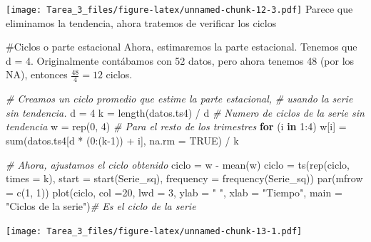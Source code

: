 \documentclass[
]{article}
\newenvironment{Shaded}{\begin{snugshade}}{\end{snugshade}}
\newcommand{\AttributeTok}[1]{\textcolor[rgb]{0.77,0.63,0.00}{#1}}
\newcommand{\CommentTok}[1]{\textcolor[rgb]{0.56,0.35,0.01}{\textit{#1}}}
\newcommand{\ConstantTok}[1]{\textcolor[rgb]{0.00,0.00,0.00}{#1}}
\newcommand{\ControlFlowTok}[1]{\textcolor[rgb]{0.13,0.29,0.53}{\textbf{#1}}}
\newcommand{\DecValTok}[1]{\textcolor[rgb]{0.00,0.00,0.81}{#1}}
\newcommand{\FunctionTok}[1]{\textcolor[rgb]{0.00,0.00,0.00}{#1}}
\newcommand{\NormalTok}[1]{#1}
\newcommand{\OtherTok}[1]{\textcolor[rgb]{0.56,0.35,0.01}{#1}}
\newcommand{\SpecialCharTok}[1]{\textcolor[rgb]{0.00,0.00,0.00}{#1}}
\newcommand{\StringTok}[1]{\textcolor[rgb]{0.31,0.60,0.02}{#1}}
\begin{document}
\texttt{[image: Tarea\_3\_files/figure-latex/unnamed-chunk-12-3.pdf]}
Parece que eliminamos la tendencia, ahora tratemos de verificar los
ciclos

\#Ciclos o parte estacional Ahora, estimaremos la parte estacional.
Tenemos que d = 4. Originalmente contábamos con 52 datos, pero ahora
tenemos 48 (por los NA), entonces \(\frac{48}{4}=12\) ciclos.

\begin{Shaded}
\begin{Highlighting}[]
\CommentTok{\# Creamos un ciclo promedio que estime la parte estacional,}
\CommentTok{\# usando la serie sin tendencia.}
\NormalTok{d }\OtherTok{=} \DecValTok{4}
\NormalTok{k }\OtherTok{=} \FunctionTok{length}\NormalTok{(datos.ts4) }\SpecialCharTok{/}\NormalTok{ d }\CommentTok{\# Numero de ciclos de la serie sin tendencia}
\NormalTok{w }\OtherTok{=} \FunctionTok{rep}\NormalTok{(}\DecValTok{0}\NormalTok{, }\DecValTok{4}\NormalTok{) }
\CommentTok{\# Para el resto de los trimestres}
\ControlFlowTok{for}\NormalTok{ (i }\ControlFlowTok{in} \DecValTok{1}\SpecialCharTok{:}\DecValTok{4}\NormalTok{)}
\NormalTok{  w[i] }\OtherTok{=} \FunctionTok{sum}\NormalTok{(datos.ts4[d }\SpecialCharTok{*}\NormalTok{ (}\DecValTok{0}\SpecialCharTok{:}\NormalTok{(k}\DecValTok{{-}1}\NormalTok{)) }\SpecialCharTok{+}\NormalTok{ i], }\AttributeTok{na.rm =} \ConstantTok{TRUE}\NormalTok{) }\SpecialCharTok{/}\NormalTok{ k}

\CommentTok{\# Ahora, ajustamos el ciclo obtenido}
\NormalTok{ciclo  }\OtherTok{=}\NormalTok{ w }\SpecialCharTok{{-}} \FunctionTok{mean}\NormalTok{(w)}
\NormalTok{ciclo }\OtherTok{=} \FunctionTok{ts}\NormalTok{(}\FunctionTok{rep}\NormalTok{(ciclo, }\AttributeTok{times =}\NormalTok{ k), }\AttributeTok{start =} \FunctionTok{start}\NormalTok{(Serie\_sq), }
           \AttributeTok{frequency =} \FunctionTok{frequency}\NormalTok{(Serie\_sq))}
\FunctionTok{par}\NormalTok{(}\AttributeTok{mfrow =} \FunctionTok{c}\NormalTok{(}\DecValTok{1}\NormalTok{, }\DecValTok{1}\NormalTok{))}
\FunctionTok{plot}\NormalTok{(ciclo, }\AttributeTok{col =}\DecValTok{20}\NormalTok{, }\AttributeTok{lwd =} \DecValTok{3}\NormalTok{, }\AttributeTok{ylab =} \StringTok{" "}\NormalTok{, }\AttributeTok{xlab =} \StringTok{"Tiempo"}\NormalTok{,}
     \AttributeTok{main =} \StringTok{"Ciclos de la serie"}\NormalTok{)}\CommentTok{\# Es el ciclo de la serie }
\end{Highlighting}
\end{Shaded}

\texttt{[image: Tarea\_3\_files/figure-latex/unnamed-chunk-13-1.pdf]}
\end{document}
